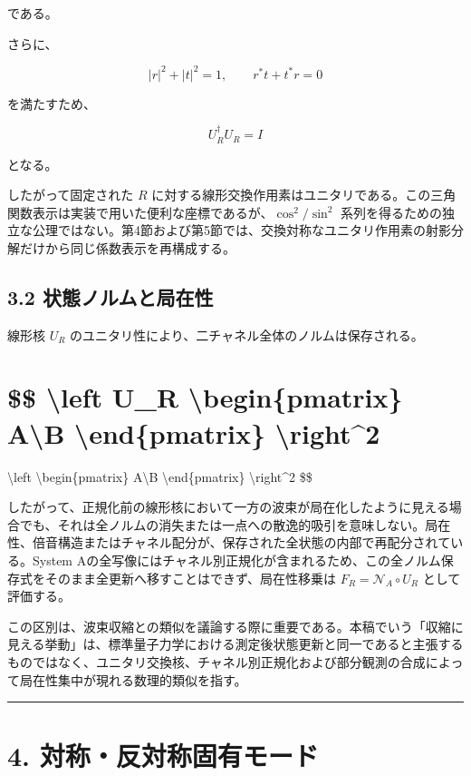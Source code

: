 \documentclass[
  a4paper,
  10pt]{article}
\begin{document}
である。

さらに、

\[
|r|^2+|t|^2=1,
\qquad
r^*t+t^*r=0
\]

を満たすため、

\[
U_R^\dagger U_R=I
\]

となる。

したがって固定された \(R\)
に対する線形交換作用素はユニタリである。この三角関数表示は実装で用いた便利な座標であるが、\(\cos^2/\sin^2\)
系列を得るための独立な公理ではない。第4節および第5節では、交換対称なユニタリ作用素の射影分解だけから同じ係数表示を再構成する。

\subsection{3.2
状態ノルムと局在性}\label{32-ux72b6ux614bux30ceux30ebux30e0ux3068ux5c40ux5728ux6027}

線形核 \(U_R\) のユニタリ性により、二チャネル全体のノルムは保存される。

\section{\$\$ \textbackslash left\textbar{} U\_R
\textbackslash begin\{pmatrix\} A\textbackslash B
\textbackslash end\{pmatrix\}
\textbackslash right\textbar\^{}2}\label{-left-u_r-beginpmatrix-ab-endpmatrix-right2}

\textbackslash left\textbar{} \textbackslash begin\{pmatrix\}
A\textbackslash B \textbackslash end\{pmatrix\}
\textbackslash right\textbar\^{}2 \$\$

したがって、正規化前の線形核において一方の波束が局在化したように見える場合でも、それは全ノルムの消失または一点への散逸的吸引を意味しない。局在性、倍音構造またはチャネル配分が、保存された全状態の内部で再配分されている。System
Aの全写像にはチャネル別正規化が含まれるため、この全ノルム保存式をそのまま全更新へ移すことはできず、局在性移乗は
\(F_R=\mathcal N_A\circ U_R\) として評価する。

この区別は、波束収縮との類似を議論する際に重要である。本稿でいう「収縮に見える挙動」は、標準量子力学における測定後状態更新と同一であると主張するものではなく、ユニタリ交換核、チャネル別正規化および部分観測の合成によって局在性集中が現れる数理的類似を指す。

\begin{center}\rule{0.5\linewidth}{0.5pt}\end{center}

\section{4.
対称・反対称固有モード}\label{4-ux5bfeux79f0ux53cdux5bfeux79f0ux56faux6709ux30e2ux30fcux30c9}
\end{document}
